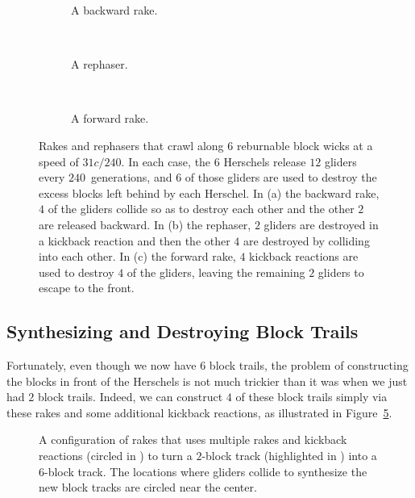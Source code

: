 \begin{figure}[!htb]
	\centering
	\begin{subfigure}{0.28\textwidth}
		\centering
		\caption{A backward rake.}\label{fig:31c_240_back_rake}
	\end{subfigure} \ \ \begin{subfigure}{0.28\textwidth}
		\centering
		\caption{A rephaser.}\label{fig:31c_240_rephaser}
	\end{subfigure} \ \ \begin{subfigure}{0.4\textwidth}
		\centering
		\caption{A forward rake.}\label{fig:31c_240_forward_rake}
	\end{subfigure}
	\caption{Rakes and rephasers that crawl along $6$ reburnable block wicks at a speed of $31c/240$. In each case, the $6$ Herschels release $12$ gliders every $240$~generations, and $6$ of those gliders are used to destroy the excess blocks left behind by each Herschel. In (a) the backward rake, $4$ of the gliders collide so as to destroy each other and the other $2$ are released backward. In (b) the rephaser, $2$ gliders are destroyed in a kickback reaction and then the other $4$ are destroyed by colliding into each other. In (c) the forward rake, $4$ kickback reactions are used to destroy $4$ of the gliders, leaving the remaining $2$ gliders to escape to the front.}\label{fig:31c_240_rakes_and_rephaser}
\end{figure}


\subsection{Synthesizing and Destroying Block Trails}\label{sec:silverfish_synth_destroy_blocks}

Fortunately, even though we now have $6$ block trails, the problem of constructing the blocks in front of the Herschels is not much trickier than it was when we just had $2$ block trails. Indeed, we can construct $4$ of these block trails simply via these rakes and some additional kickback reactions, as illustrated in Figure~\ref{fig:31c_240_track_builder}.

\begin{figure}[!htb]
	\centering
	\caption{A configuration of rakes that uses multiple rakes and kickback reactions (circled in ) to turn a $2$-block track (highlighted in ) into a $6$-block track. The locations where gliders collide to synthesize the new block tracks are circled near the center.}\label{fig:31c_240_track_builder}
\end{figure}

